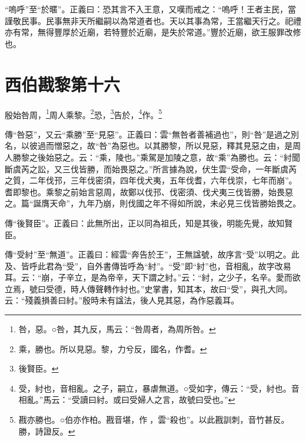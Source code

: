 {\noindent\shu{}\fzkt “嗚呼”至“於暱”。正義曰：恐其言不入王意，又嘆而戒之：“嗚呼！王者主民，當謹敬民事。民事無非天所繼嗣以為常道者也。天以其事為常，王當繼天行之。祀禮亦有常，無得豐厚於近廟，若特豐於近廟，是失於常道。”豐於近廟，欲王服罪改修也。 \par}

\section{西伯戡黎第十六}


殷始咎周，\footnote{咎，惡。○咎，其九反，馬云：“咎周者，為周所咎。}周人乘黎。\footnote{乘，勝也。所以見惡。黎，力兮反，國名，作耆。}恐，\footnote{後賢臣。}告於，\footnote{受，紂也，音相亂。之子，嗣立，暴虐無道。○受如字，傳云：“受，紂也。音相亂。”馬云：“受讀曰紂。或曰受婦人之言，故號曰受也。”}作。\footnote{戡亦勝也。○伯亦作柏。戡音堪，作𢦟，雲“殺也”。以此戡訓刺，音竹甚反。勝，詩證反。}

{\noindent\zhuan{}\fzbyks 傳“咎惡”，又云“乘勝”至“見惡”。正義曰：雲“無咎者善補過也”，則“咎”是過之別名，以彼過而憎惡之，故“咎”為惡也。以其勝黎，所以見惡，釋其見惡之由，是周人勝黎之後始惡之。云：“乘，陵也。”乘駕是加陵之意，故“乘”為勝也。云：“紂聞斷虞芮之訟，又三伐皆勝，而始畏惡之。”所言據為說，伏生雲“受命，一年斷虞芮之質，二年伐邘，三年伐密須，四年伐犬夷，五年伐耆，六年伐崇，七年而崩”。耆即黎也。乘黎之前始言惡周，故鄭以伐邘、伐密須、伐犬夷三伐皆勝，始畏惡之。篇“誕膺天命”，九年乃崩，則伐國之年不得如所說，未必見三伐皆勝始畏之。 \par}

{\noindent\zhuan{}\fzbyks 傳“後賢臣”。正義曰：此無所出，正以同為祖氏，知是其後，明能先覺，故知賢臣。 \par}

{\noindent\zhuan{}\fzbyks 傳“受紂”至“無道”。正義曰：經雲“奔告於王”，王無諡號，故序言“受”以明之。此及、皆呼此君為“受”，自外書傳皆呼為“紂”。“受”即“紂”也，音相亂，故字改易耳。云：“崩，子辛立，是為帝辛，天下謂之紂。”云：“紂，之少子，名辛。愛而欲立焉，號曰受德，時人傳聲轉作紂也。”史掌書，知其本，故曰“受”，與孔大同。云：“殘義損善曰紂。”殷時未有諡法，後人見其惡，為作惡義耳。 \par}

